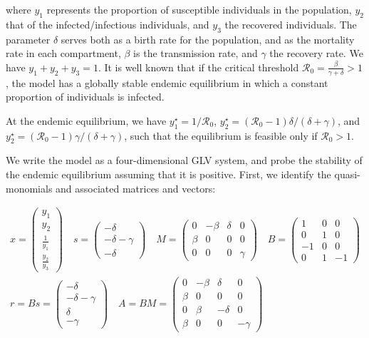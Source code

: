 \documentclass{article}
\begin{document}
where \(y_1\) represents the proportion of susceptible individuals in
the population, \(y_2\) that of the infected/infectious individuals, and
\(y_3\) the recovered individuals. The parameter \(\delta\) serves both
as a birth rate for the population, and as the mortality rate in each
compartment, \(\beta\) is the transmission rate, and \(\gamma\) the
recovery rate. We have \(y_1 + y_2 + y_3 = 1\). It is well known that if
the critical threshold
\(\mathcal R_0 = \frac{\beta}{\gamma + \delta} > 1\), the model has a
globally stable endemic equilibrium in which a constant proportion of
individuals is infected.

At the endemic equilibrium, we have \(y_1^\star = 1 / \mathcal R_0\),
\(y_2^\star = (\mathcal R_0 - 1) \delta / (\delta + \gamma)\), and
\(y_2^\star = (\mathcal R_0 - 1) \gamma / (\delta + \gamma)\), such that
the equilibrium is feasible only if \(\mathcal R_0 >1\).

We write the model as a four-dimensional GLV system, and probe the
stability of the endemic equilibrium assuming that it is positive.
First, we identify the quasi-monomials and associated matrices and
vectors:

\begin{equation}
\begin{aligned}
x = \begin{pmatrix}
y_1\\
y_2\\
\frac{1}{y_1}\\
\frac{y_2}{y_3}
\end{pmatrix}
\quad
s = \begin{pmatrix}
-\delta \\
-\delta - \gamma \\
-\delta
\end{pmatrix}
\quad
M = \begin{pmatrix}
0 & -\beta & \delta & 0\\
\beta & 0 & 0 & 0 \\
0 & 0 & 0 & \gamma
\end{pmatrix}
\quad
B = \begin{pmatrix}
1 & 0 & 0\\
0 & 1 & 0\\
-1 & 0 & 0\\
0 & 1 & -1
\end{pmatrix}
\\
r = Bs= \begin{pmatrix}
-\delta \\
-\delta - \gamma \\
\delta\\
-\gamma
\end{pmatrix}
\quad 
A = BM = \begin{pmatrix}
0 & -\beta & \delta & 0 \\
\beta & 0 & 0 & 0\\
0 & \beta & -\delta & 0 \\
\beta & 0 & 0 & -\gamma
\end{pmatrix}
\end{aligned}
\end{equation}
\end{document}
